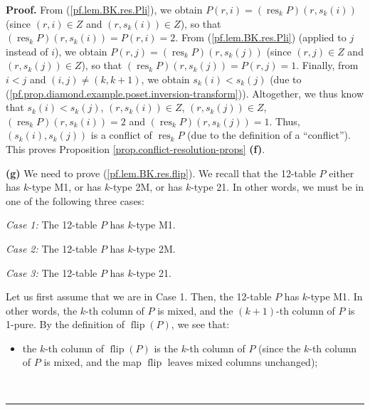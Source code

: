 \documentclass[numbers=enddot,12pt,final,onecolumn,notitlepage]{scrartcl}%
\theoremstyle{definition}
\newenvironment{proof}[1][Proof]{\noindent\textbf{#1.} }{\ \rule{0.5em}{0.5em}}
\begin{document}
\begin{proof}
From (\ref{pf.lem.BK.res.Pli}), we obtain $P\left(  r,i\right)  =\left(
\operatorname*{res}\nolimits_{k}P\right)  \left(  r,s_{k}\left(  i\right)
\right)  $ (since $\left(  r,i\right)  \in Z$ and $\left(  r,s_{k}\left(
i\right)  \right)  \in Z$), so that $\left(  \operatorname*{res}%
\nolimits_{k}P\right)  \left(  r,s_{k}\left(  i\right)  \right)  =P\left(
r,i\right)  =2$. From (\ref{pf.lem.BK.res.Pli}) (applied to $j$ instead of
$i$), we obtain $P\left(  r,j\right)  =\left(  \operatorname*{res}%
\nolimits_{k}P\right)  \left(  r,s_{k}\left(  j\right)  \right)  $ (since
$\left(  r,j\right)  \in Z$ and $\left(  r,s_{k}\left(  j\right)  \right)  \in
Z$), so that $\left(  \operatorname*{res}\nolimits_{k}P\right)  \left(
r,s_{k}\left(  j\right)  \right)  =P\left(  r,j\right)  =1$. Finally, from
$i<j$ and $\left(  i,j\right)  \neq\left(  k,k+1\right)  $, we obtain
$s_{k}\left(  i\right)  <s_{k}\left(  j\right)  $ (due to
(\ref{pf.prop.diamond.example.poset.inversion-transform})). Altogether, we
thus know that $s_{k}\left(  i\right)  <s_{k}\left(  j\right)  $, $\left(
r,s_{k}\left(  i\right)  \right)  \in Z$, $\left(  r,s_{k}\left(  j\right)
\right)  \in Z$, $\left(  \operatorname*{res}\nolimits_{k}P\right)  \left(
r,s_{k}\left(  i\right)  \right)  =2$ and $\left(  \operatorname*{res}%
\nolimits_{k}P\right)  \left(  r,s_{k}\left(  j\right)  \right)  =1$. Thus,
$\left(  s_{k}\left(  i\right)  ,s_{k}\left(  j\right)  \right)  $ is a
conflict of $\operatorname*{res}\nolimits_{k}P$ (due to the definition of a
\textquotedblleft conflict\textquotedblright). This proves Proposition
\ref{prop.conflict-resolution-props} \textbf{(f)}.

\textbf{(g)} We need to prove (\ref{pf.lem.BK.res.flip}). We recall that the
12-table $P$ either has $k$-type M1, or has $k$-type 2M, or has $k$-type 21.
In other words, we must be in one of the following three cases:

\textit{Case 1:} The 12-table $P$ has $k$-type M1.

\textit{Case 2:} The 12-table $P$ has $k$-type 2M.

\textit{Case 3:} The 12-table $P$ has $k$-type 21.

Let us first assume that we are in Case 1. Then, the 12-table $P$ has $k$-type
M1. In other words, the $k$-th column of $P$ is mixed, and the $\left(
k+1\right)  $-th column of $P$ is 1-pure. By the definition of
$\operatorname*{flip}\left(  P\right)  $, we see that:

\begin{itemize}
\item the $k$-th column of $\operatorname*{flip}\left(  P\right)  $ is the
$k$-th column of $P$ (since the $k$-th column of $P$ is mixed, and the map
$\operatorname*{flip}$ leaves mixed columns unchanged);


\end{itemize}
\end{proof}
\end{document}
